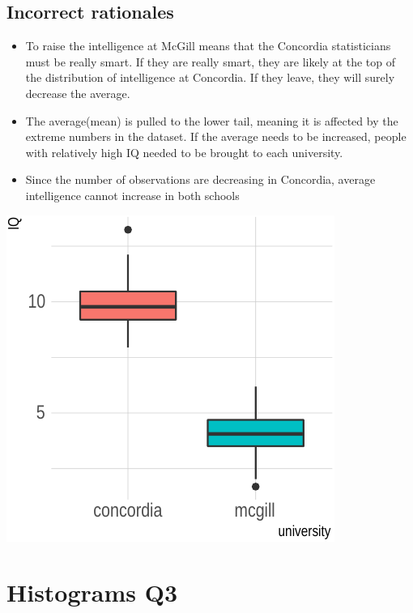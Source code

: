 \documentclass[letterpaper,10pt,twoside,printwatermark=false]{pinp}
\providecommand{\tightlist}{%
  \setlength{\itemsep}{0pt}\setlength{\parskip}{0pt}}
\begin{document}
\subsection{Incorrect rationales}\label{incorrect-rationales-1}

\begin{itemize}
\tightlist
\item
  To raise the intelligence at McGill means that the Concordia
  statisticians must be really smart. If they are really smart, they are
  likely at the top of the distribution of intelligence at Concordia. If
  they leave, they will surely decrease the average.
\item
  The average(mean) is pulled to the lower tail, meaning it is affected
  by the extreme numbers in the dataset. If the average needs to be
  increased, people with relatively high IQ needed to be brought to each
  university.
\item
  Since the number of observations are decreasing in Concordia, average
  intelligence cannot increase in both schools
\end{itemize}

\begin{center}\includegraphics{001-hist-mean-sol_files/figure-latex/unnamed-chunk-2-1} \end{center}

\section{Histograms Q3}\label{histograms-q3}
\end{document}
